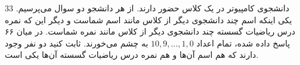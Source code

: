 \EXERCISE
$33$
 دانشجوی کامپیوتر در یک کلاس حضور دارند. از هر دانشجو دو سوال می‌پرسیم. یکی اینکه اسم چند دانشجوی دیگر از کلاس مانند اسم شماست و دیگر این که نمره درس ریاضیات گسسته چند دانشجوی دیگر از کلاس مانند نمره شماست. در میان ۶۶ پاسخ داده شده، تمام اعداد $10,9,...,1,0$ به چشم می‌خورند. ثابت کنید دو نفر وجود دارند که هم اسم آن‌ها و هم نمره درس ریاضیات گسسته آن‌ها یکی است.